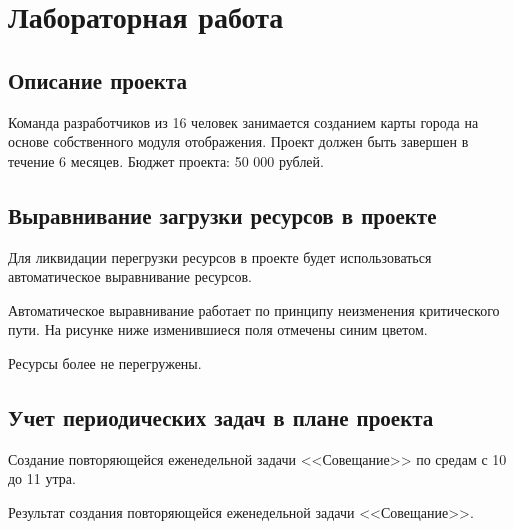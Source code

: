 \chapter{Лабораторная работа}

\section{Описание проекта}

Команда разработчиков из 16 человек занимается созданием карты города на основе собственного модуля отображения. Проект должен быть завершен в течение 6 месяцев. Бюджет проекта: 50 000 рублей.

\section{Выравнивание загрузки ресурсов в проекте}

Для ликвидации перегрузки ресурсов в проекте будет использоваться автоматическое выравнивание ресурсов.


Автоматическое выравнивание работает по принципу неизменения критического пути. На рисунке ниже изменившиеся поля отмечены синим цветом.

\clearpage


Ресурсы более не перегружены.


\clearpage


\section{Учет периодических задач в плане проекта}

Создание повторяющейся еженедельной задачи <<Совещание>> по средам с 10 до 11 утра.


\clearpage

Результат создания повторяющейся еженедельной задачи <<Совещание>>.


